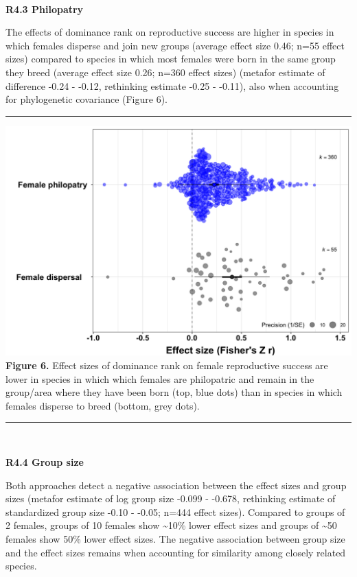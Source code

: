 \documentclass[
]{article}
\begin{document}
~

\textbf{R4.3 Philopatry}

The effects of dominance rank on reproductive success are higher in
species in which females disperse and join new groups (average effect
size 0.46; n=55 effect sizes) compared to species in which most females
were born in the same group they breed (average effect size 0.26; n=360
effect sizes) (metafor estimate of difference -0.24 - -0.12, rethinking
estimate -0.25 - -0.11), also when accounting for phylogenetic
covariance (Figure 6).

\begin{center}\rule{0.5\linewidth}{0.5pt}\end{center}

\includegraphics{ranksuccess_Fig6_effectsize_philopatry.png}
\textbf{Figure 6.} Effect sizes of dominance rank on female reproductive
success are lower in species in which which females are philopatric and
remain in the group/area where they have been born (top, blue dots) than
in species in which females disperse to breed (bottom, grey dots).

\begin{center}\rule{0.5\linewidth}{0.5pt}\end{center}

~

\textbf{R4.4 Group size}

Both approaches detect a negative association between the effect sizes
and group sizes (metafor estimate of log group size -0.099 - -0.678,
rethinking estimate of standardized group size -0.10 - -0.05; n=444
effect sizes). Compared to groups of 2 females, groups of 10 females
show \textasciitilde10\% lower effect sizes and groups of
\textasciitilde50 females show 50\% lower effect sizes. The negative
association between group size and the effect sizes remains when
accounting for similarity among closely related species.
\end{document}
